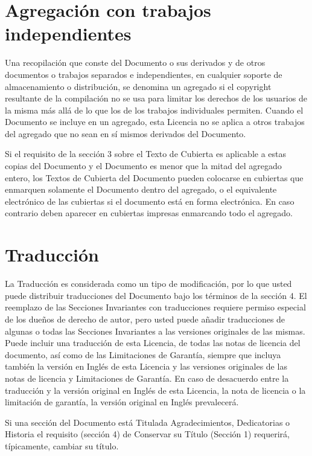 \section{Agregación con trabajos independientes}

Una recopilación que conste del Documento o sus derivados y de otros
documentos o trabajos separados e independientes, en cualquier soporte
de almacenamiento o distribución, se denomina un agregado si el
copyright resultante de la compilación no se usa para limitar los
derechos de los usuarios de la misma más allá de lo que los de los
trabajos individuales permiten. Cuando el Documento se incluye en un
agregado, esta Licencia no se aplica a otros trabajos del agregado que
no sean en sí mismos derivados del Documento.

Si el requisito de la sección 3 sobre el Texto de Cubierta es
aplicable a estas copias del Documento y el Documento es menor que la
mitad del agregado entero, los Textos de Cubierta del Documento pueden
colocarse en cubiertas que enmarquen solamente el Documento dentro del
agregado, o el equivalente electrónico de las cubiertas si el
documento está en forma electrónica. En caso contrario deben aparecer
en cubiertas impresas enmarcando todo el agregado.


\section{Traducción}

La Traducción es considerada como un tipo de modificación, por lo que
usted puede distribuir traducciones del Documento bajo los términos de
la sección 4. El reemplazo de las Secciones Invariantes con traducciones
requiere permiso especial de los dueños de derecho de autor, pero
usted puede añadir traducciones de algunas o todas las Secciones
Invariantes a las versiones originales de las mismas. Puede incluir
una traducción de esta Licencia, de todas las notas de licencia del
documento, así como de las Limitaciones de Garantía, siempre que
incluya también la versión en Inglés de esta Licencia y las versiones
originales de las notas de licencia y Limitaciones de Garantía. En
caso de desacuerdo entre la traducción y la versión original en Inglés
de esta Licencia, la nota de licencia o la limitación de garantía, la
versión original en Inglés prevalecerá.

Si una sección del Documento está Titulada Agradecimientos,
Dedicatorias o Historia el requisito (sección 4) de Conservar su
Título (Sección 1) requerirá, típicamente, cambiar su título.


